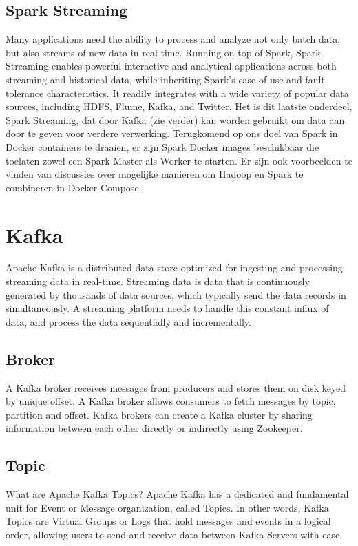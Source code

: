 \subsection{Spark Streaming}
Many applications need the ability to process and analyze not only batch data, but also streams of new data in real-time. Running on top of Spark, Spark Streaming enables powerful interactive and analytical applications across both streaming and historical data, while inheriting Spark’s ease of use and fault tolerance characteristics. It readily integrates with a wide variety of popular data sources, including HDFS, Flume, Kafka, and Twitter.\autocite{databricks2023}
\newline
\newline
Het is dit laatste onderdeel, Spark Streaming, dat door Kafka (zie verder) kan worden gebruikt om data aan door te geven voor verdere verwerking.
\newline
\newline
Terugkomend op ons doel van Spark in Docker containers te draaien, er zijn Spark Docker images beschikbaar die toelaten zowel een Spark Master als Worker te starten.
\newline
\newline
Er zijn ook voorbeelden te vinden van discussies over mogelijke manieren om Hadoop en Spark te combineren in Docker Compose.


\section{Kafka}
Apache Kafka is a distributed data store optimized for ingesting and processing streaming data in real-time. Streaming data is data that is continuously generated by thousands of data sources, which typically send the data records in simultaneously. A streaming platform needs to handle this constant influx of data, and process the data sequentially and incrementally.
\autocite{AwsAmazon2023b}

\subsection{Broker}
A Kafka broker receives messages from producers and stores them on disk keyed by unique offset. A Kafka broker allows consumers to fetch messages by topic, partition and offset. Kafka brokers can create a Kafka cluster by sharing information between each other directly or indirectly using Zookeeper.\autocite{GitBook2023}

\subsection{Topic}
What are Apache Kafka Topics? Apache Kafka has a dedicated and fundamental unit for Event or Message organization, called Topics. In other words, Kafka Topics are Virtual Groups or Logs that hold messages and events in a logical order, allowing users to send and receive data between Kafka Servers with ease.\autocite{Ishwarya2022}

